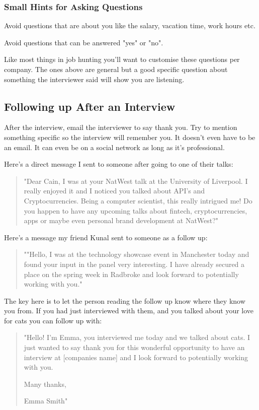 \documentclass{article}
\begin{document}
\subsubsection{Small Hints for Asking Questions}
Avoid questions that are about you like the salary, vacation time, work
hours etc.

Avoid questions that can be answered "yes" or "no".

Like most things in job hunting you'll want to customise these questions
per company. The ones above are general but a good specific question
about something the interviewer said will show you are listening.
\subsection{Following up After an Interview}
After the interview, email the interviewer to say thank you. Try to
mention something specific so the interview will remember you. It
doesn't even have to be an email. It can even be on a social network as
long as it's professional.

Here's a direct message I sent to someone after going to one of their
talks:
\begin{quote}
    "Dear Cain, I was at your NatWest talk at the University of Liverpool.
I really enjoyed it and I noticed you talked about API's and
Cryptocurrencies. Being a computer scientist, this really intrigued me!
Do you happen to have any upcoming talks about fintech,
cryptocurrencies, apps or maybe even personal brand development at
NatWest?"
\end{quote}
Here's a message my friend Kunal sent to someone as a follow up:
\begin{quote}
    ""Hello, I was at the technology showcase event in Manchester today and
found your input in the panel very interesting. I have already secured a
place on the spring week in Radbroke and look forward to potentially
working with you."
\end{quote}

The key here is to let the person reading the follow up know where they
know you from. If you had just interviewed with them, and you talked
about your love for cats you can follow up with:

\begin{quote}
    "Hello! I'm Emma, you interviewed me today and we talked about cats. I
just wanted to say thank you for this wonderful opportunity to have an
interview at {[}companies name{]} and I look forward to potentially
working with you.

Many thanks,

Emma Smith"
\end{quote}
\end{document}
